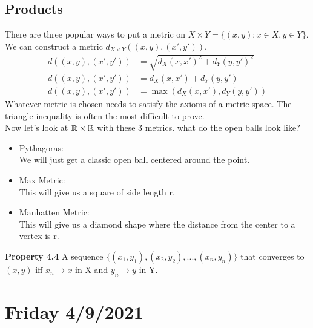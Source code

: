 \documentclass{article}
\begin{document}
  \subsection{Products}
  There are three popular ways to put a metric on $X\times Y=\{(x,y):x\in X, y\in Y\}$. We can construct a metric $d_{X\times Y}((x,y),(x',y'))$.
  \begin{align*}
    d((x,y),(x',y'))&=\sqrt{d_X(x,x')^2+d_Y(y,y')^2}\\
    d((x,y),(x',y'))&=d_X(x,x')+d_Y(y,y')\\
    d((x,y),(x',y'))&=\max(d_X(x,x'),d_Y(y,y'))
  \end{align*}
  Whatever metric is chosen needs to satisfy the axioms of a metric space. The triangle inequality is often the most difficult to prove.\\
  Now let's look at $\mathbb{R}\times\mathbb{R}$ with these 3 metrics. what do the open balls look like?
  \begin{itemize}
    \item Pythagoras:\\
    We will just get a classic open ball centered around the point.
    \item Max Metric:\\
    This will give us a square of side length r.
    \item Manhatten Metric:\\
    This will give us a diamond shape where the distance from the center to a vertex is r.
  \end{itemize}
  \textbf{Property 4.4} A sequence $\{(x_1,y_1),(x_2,y_2),...,(x_n,y_n)\}$ that converges to $(x,y)$ iff $x_n\to x$ in X and $y_n\to y$ in Y.
  \section{Friday 4/9/2021}
  
\end{document}
